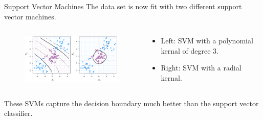 \documentclass[
  ignorenonframetext,
  aspectratio=169,
]{beamer}
\begin{document}
\begin{frame}{Support Vector Machines}
\protect\hypertarget{support-vector-machines-2}{}
The data set is now fit with two different support vector machines.

\begin{columns}[T]
\begin{column}{0.48\textwidth}
\begin{figure}

{\centering \includegraphics[width=3.125in,height=\textheight]{images/SVMperformance.png}

}

\end{figure}
\end{column}

\begin{column}{0.3\textwidth}
\begin{itemize}
\item
  Left: SVM with a polynomial kernal of degree 3.
\item
  Right: SVM with a radial kernal.
\end{itemize}
\end{column}
\end{columns}

These SVMs capture the decision boundary much better than the support
vector classifier.
\end{frame}
\end{document}
